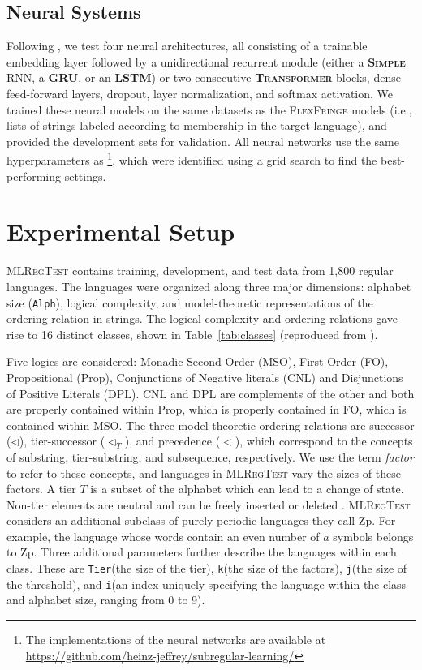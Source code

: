 \documentclass[twoside,11pt]{article}
\newcommand{\ttt}[1]{\texttt{#1}}
\newcommand{\tttx}[1]{\ttt{#1}\xspace}
\newcommand{\Alpha}{\tttx{Alph}}
\newcommand{\Tier}{\tttx{Tier}}
\newcommand{\kay}{\tttx{k}}
\newcommand{\jay}{\tttx{j}}
\newcommand{\eye}{\tttx{i}}
\begin{document}
\subsection{Neural Systems} \label{sec:neural}
Following \citet{mlregtest}, we test four neural architectures, all
consisting of a trainable embedding layer followed by a unidirectional
recurrent module (either a \textbf{\textsc{Simple}} RNN, a
\textbf{GRU}, or an \textbf{LSTM}) or two consecutive
\textbf{\textsc{Transformer}} blocks, dense feed-forward layers,
dropout, layer normalization, and softmax activation. 
We trained these neural models on the same datasets as the \textsc{FlexFringe} models (i.e., lists of strings labeled according to membership in the target language), and provided the development sets for validation.
All neural networks use the
same hyperparameters as \citeauthor{mlregtest}\footnote{The
  implementations of the neural networks are available at
  \href{https://github.com/heinz-jeffrey/subregular-learning/}{https://github.com/heinz-jeffrey/subregular-learning/}}, which were identified using a grid search to find the best-performing settings.

\section{Experimental Setup}\label{sec:eval}

\textsc{MLRegTest} \citep{mlregtest} contains training, development,
and test data from 1,800 regular languages. The languages were
organized along three major dimensions: alphabet size (\Alpha), logical
complexity, and model-theoretic representations of the ordering
relation in strings. The logical complexity and ordering relations
gave rise to 16 distinct classes, shown in Table~\ref{tab:classes}
(reproduced from \citet{adil23}).

Five logics are considered: Monadic Second Order (MSO), First Order
(FO), Propositional (Prop), Conjunctions of Negative literals (CNL)
and Disjunctions of Positive Literals (DPL).  CNL and DPL are
complements of the other and both are properly contained within Prop,
which is properly contained in FO, which is contained within MSO.  The
three model-theoretic ordering relations are successor
($\triangleleft$), tier-successor ($\triangleleft_T$), and precedence
($<$), which correspond to the concepts of substring, tier-substring,
and subsequence, respectively.  We use the term \emph{factor} to refer
to these concepts, and languages in \textsc{MLRegTest} vary the sizes
of these factors. A tier $T$ is a subset of the alphabet which can
lead to a change of state. Non-tier elements are neutral and can be
freely inserted or deleted \citep{Lambert2023}. \textsc{MLRegTest}
considers an additional subclass of purely periodic languages they
call Zp. For example, the language whose words contain an even number
of $a$ symbols belongs to Zp. Three additional parameters further
describe the languages within each class. These are \Tier (the size of
the tier), \kay (the size of the factors), \jay (the size of the
threshold), and \eye (an index uniquely specifying the language within
the class and alphabet size, ranging from 0 to 9).
\end{document}
